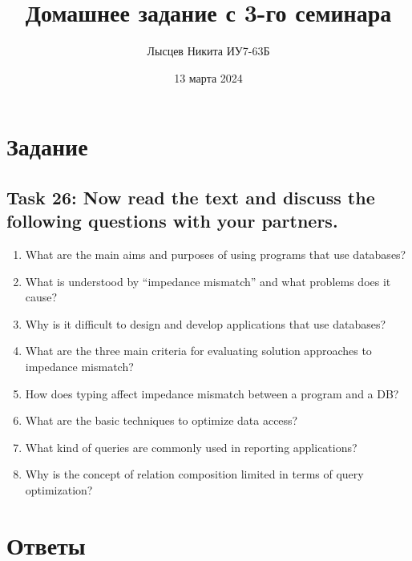 \documentclass[a4paper,14pt, unknownkeysallowed]{extreport}
\title{Домашнее задание с 3-го семинара}
\author{Лысцев Никита ИУ7-63Б}
\date{13 марта 2024}
\begin{document}
	\maketitle
	
\section*{Задание}

\subsection*{Task 26: Now read the text and discuss the following questions with your partners.}

\begin{enumerate}
	\item What are the main aims and purposes of using programs that use databases?
	\item What is understood by “impedance mismatch” and what problems does it cause?
	\item Why is it difficult to design and develop applications that use databases?
	\item What are the three main criteria for evaluating solution approaches to impedance mismatch?
	\item How does typing affect impedance mismatch between a program and a DB?
	\item What are the basic techniques to optimize data access?
	\item What kind of queries are commonly used in reporting applications?
	\item Why is the concept of relation composition limited in terms of query	optimization?
\end{enumerate}

\section*{Ответы}
\end{document}
